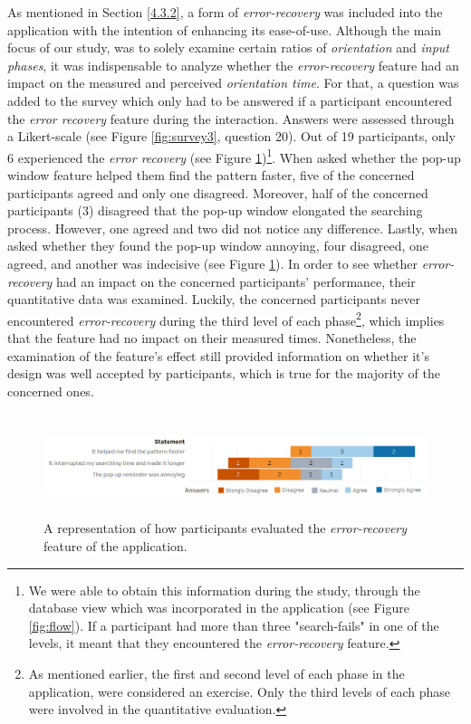 As mentioned in Section \ref{4.3.2}, a form of \textit{error-recovery} was included into the application with the intention of enhancing its ease-of-use. Although the main focus of our study, was to solely examine certain ratios of \textit{orientation} and \textit{input phases}, it was indispensable to analyze whether the \textit{error-recovery} feature had an impact on the measured and perceived \textit{orientation time}. For that, a question was added to the survey which only had to be answered if a participant encountered the \textit{error recovery} feature during the interaction. Answers were assessed through a Likert-scale (see Figure \ref{fig:survey3}, question 20). Out of 19 participants, only 6 experienced the \textit{error recovery} (see Figure \ref{fig:error})\footnote{We were able to obtain this information during the study, through the database view which was incorporated in the application (see Figure \ref{fig:flow}). If a participant had more than three "search-fails" in one of the levels, it meant that they encountered the \textit{error-recovery} feature.}. When asked whether the pop-up window feature helped them find the pattern faster, five of the concerned participants agreed and only one disagreed. Moreover, half of the concerned participants (3) disagreed that the pop-up window elongated the searching process. However, one agreed and two did not notice any difference. Lastly, when asked whether they found the pop-up window annoying, four disagreed, one agreed, and another was indecisive (see Figure \ref{fig:error}). In order to see whether \textit{error-recovery} had an impact on the concerned participants' performance, their quantitative data was examined. Luckily, the concerned participants never encountered \textit{error-recovery} during the third level of each phase\footnote{As mentioned earlier, the first and second level of each phase in the application, were considered an exercise. Only the third levels of each phase were involved in the quantitative evaluation.}, which implies that the feature had no impact on their measured times. Nonetheless, the examination of the feature's effect still provided information on whether it's design was well accepted by participants, which is true for the majority of the concerned ones. 

\begin{figure}[H]
\centering
\includegraphics[width=15cm, height=3cm]{Chapters/graphics/ErrorRecovery.png}
\caption{A representation of how participants evaluated the \textit{error-recovery} feature of the application.}
\label{fig:error}
\end{figure}
